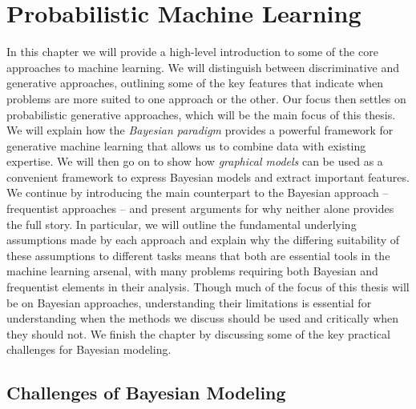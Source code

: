 %
%	


\chapter{Probabilistic Machine Learning}
\label{chp:bayes}

In this chapter we will provide a high-level introduction to  some of the core approaches to
machine learning.  We will distinguish between discriminative and generative approaches,
outlining some of the key features that indicate when problems are more suited to one approach
or the other.  Our focus then settles on probabilistic generative approaches, which
will be the main focus of this thesis.  We will explain how the \emph{Bayesian paradigm} provides
a powerful framework for generative machine learning that allows us to combine data with existing
expertise.  We will then go on to show how \emph{graphical models} can be used as a convenient
framework to express Bayesian models and extract important features.  
We continue by introducing the main counterpart to the Bayesian approach -- frequentist
approaches -- and present arguments for why neither alone provides the full story.
In particular, we will outline the fundamental underlying
assumptions made by each approach and explain why the differing suitability of these
assumptions to different tasks means that both are  essential tools in the machine learning
arsenal, with many problems requiring both Bayesian and frequentist elements in their analysis.
Though much of the focus of this thesis will be on Bayesian approaches, understanding their limitations
is essential for understanding when the methods we discuss should be used and critically when they
should not.  We finish the chapter by discussing some of the key practical challenges for Bayesian modeling.







\section{Challenges of Bayesian Modeling}
\label{sec:bayes:challenges}

